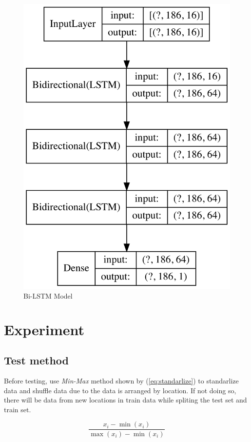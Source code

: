 \documentclass[conference]{IEEEtran}
\begin{document}
\begin{figure}[htbp]
  \centerline{\includegraphics[width=\linewidth]{figures/Model_figure.png}}
  \caption{Bi-LSTM Model}
  \label{fig:model}
\end{figure}

\section{Experiment}
\subsection{Test method}
Before testing, use \textit{Min-Max} method shown by (\ref{eq:standarlize}) to standarlize data and shuffle data due to the data is arranged by location. If not doing so, there will be data from new locations in train data while spliting the test set and train set.

\begin{equation}
  \frac{x_i-\min \left( x_i \right)}{\max \left( x_i \right) -\min \left( x_i \right)}
\label{eq:standarlize}
\end{equation}
\end{document}
